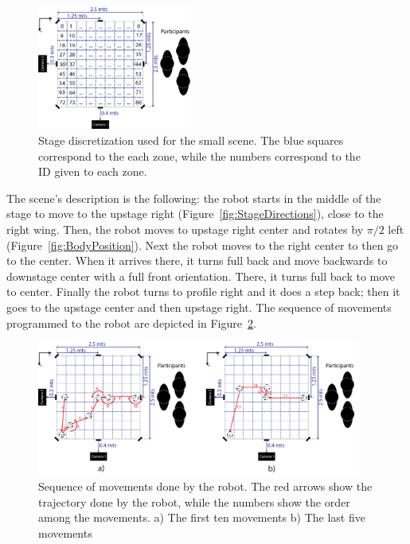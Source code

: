 \begin{figure}
	\centering
	\includegraphics[width=0.45\textwidth]{./Images/FourthCaseScene.png} 
	\caption{Stage discretization  used for the small scene. The blue squares correspond to the each zone, while the numbers correspond to the ID given to each zone.}
	\label{fig:stage_division}
\end{figure} 
The scene's description is the following: the robot starts in the middle of the stage to move to the upstage right (Figure~\ref{fig:StageDirections}), close to the right wing. Then, the robot moves to upstage right center and rotates by $\pi/2$ left (Figure~\ref{fig:BodyPosition}). Next the robot moves to the right center to then go to the center. When it arrives there, it turns full back and move backwards to downstage center with a full front orientation. There, it turns full back to move to center. Finally the robot turns to profile right and it does a step back; then it goes to the upstage center and then upstage right. The sequence of movements programmed to the robot are depicted in Figure~\ref{fig:movement}.
\begin{figure}
	\centering
	\includegraphics[width=0.95\textwidth]{./Images/fourthCaseSceneD.png} 
	\caption{Sequence of movements done by the robot. The red arrows show the trajectory done by the robot, while the numbers show the order among the movements. a) The first ten movements b) The last five movements }
	\label{fig:movement}
\end{figure}

